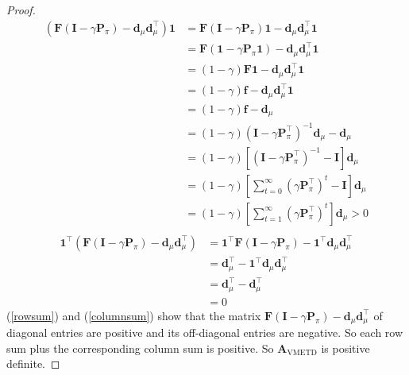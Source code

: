 \begin{proof}
\begin{equation}
    \label{rowsum}
    \begin{split}
 (\textbf{F} (\textbf{I} - \gamma \textbf{P}_{\pi})-\textbf{d}_{\mu} \textbf{d}_{\mu}^{\top} )\textbf{1}
    &=\textbf{F} (\textbf{I} - \gamma \textbf{P}_{\pi})\textbf{1}-\textbf{d}_{\mu} \textbf{d}_{\mu}^{\top} \textbf{1}\\
    &=\textbf{F}(\textbf{1}-\gamma \textbf{P}_{\pi} \textbf{1})-\textbf{d}_{\mu} \textbf{d}_{\mu}^{\top} \textbf{1}\\
    &=(1-\gamma)\textbf{F}\textbf{1}-\textbf{d}_{\mu} \textbf{d}_{\mu}^{\top} \textbf{1}\\
    &=(1-\gamma)\textbf{f}-\textbf{d}_{\mu} \textbf{d}_{\mu}^{\top} \textbf{1}\\
    &=(1-\gamma)\textbf{f}-\textbf{d}_{\mu} \\
    &=(1-\gamma)(\textbf{I}-\gamma\textbf{P}_{\pi}^{\top})^{-1}\textbf{d}_{\mu}-\textbf{d}_{\mu} \\
    &=(1-\gamma)[(\textbf{I}-\gamma\textbf{P}_{\pi}^{\top})^{-1}-\textbf{I}]\textbf{d}_{\mu} \\
    &=(1-\gamma)[\sum_{t=0}^{\infty}(\gamma\textbf{P}_{\pi}^{\top})^{t}-\textbf{I}]\textbf{d}_{\mu} \\
    &=(1-\gamma)[\sum_{t=1}^{\infty}(\gamma\textbf{P}_{\pi}^{\top})^{t}]\textbf{d}_{\mu} > 0 \\
    \end{split}
    \end{equation}
\begin{equation}
    \label{columnsum}
    \begin{split}
 \textbf{1}^{\top}(\textbf{F} (\textbf{I} - \gamma \textbf{P}_{\pi})-\textbf{d}_{\mu} \textbf{d}_{\mu}^{\top} )
    &=\textbf{1}^{\top}\textbf{F} (\textbf{I} - \gamma \textbf{P}_{\pi})-\textbf{1}^{\top}\textbf{d}_{\mu} \textbf{d}_{\mu}^{\top} \\
    &=\textbf{d}_{\mu}^{\top}-\textbf{1}^{\top}\textbf{d}_{\mu} \textbf{d}_{\mu}^{\top} \\
    &=\textbf{d}_{\mu}^{\top}- \textbf{d}_{\mu}^{\top} \\
    &=0
    \end{split}
\end{equation}
 (\ref{rowsum}) and (\ref{columnsum}) show that the matrix $\textbf{F} (\textbf{I} - \gamma \textbf{P}_{\pi})-\textbf{d}_{\mu} \textbf{d}_{\mu}^{\top}$ of
 diagonal entries are positive and its off-diagonal entries are negative. So each row sum plus the corresponding column sum is positive. 
 So $\textbf{A}_{\text{VMETD}}$ is positive definite.




\end{proof}
